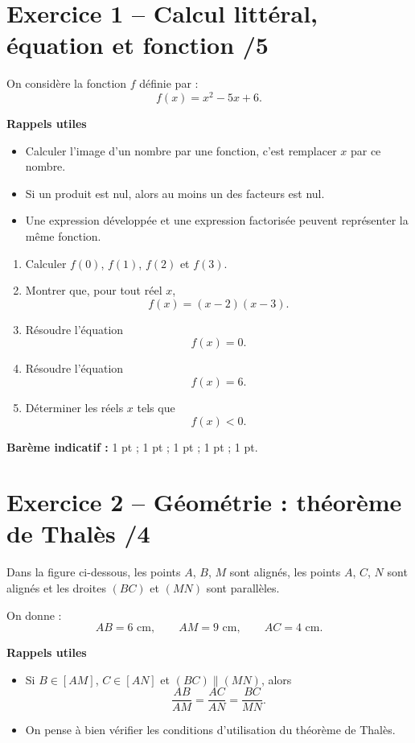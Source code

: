 \documentclass[11pt,a4paper]{article}
\begin{document}
\section*{Exercice 1 -- Calcul littéral, équation et fonction \hfill /5}

On considère la fonction \(f\) définie par :
\[
f(x)=x^2-5x+6.
\]

\textbf{Rappels utiles}
\begin{itemize}[leftmargin=1.2cm]
    \item Calculer l’image d’un nombre par une fonction, c’est remplacer \(x\) par ce nombre.
    \item Si un produit est nul, alors au moins un des facteurs est nul.
    \item Une expression développée et une expression factorisée peuvent représenter la même fonction.
\end{itemize}

\begin{enumerate}
    \item Calculer \(f(0)\), \(f(1)\), \(f(2)\) et \(f(3)\).
    \item Montrer que, pour tout réel \(x\),
    \[
    f(x)=(x-2)(x-3).
    \]
    \item Résoudre l’équation
    \[
    f(x)=0.
    \]
    \item Résoudre l’équation
    \[
    f(x)=6.
    \]
    \item Déterminer les réels \(x\) tels que
    \[
    f(x)<0.
    \]
\end{enumerate}

\textbf{Barème indicatif :} 1 pt ; 1 pt ; 1 pt ; 1 pt ; 1 pt.

\section*{Exercice 2 -- Géométrie : théorème de Thalès \hfill /4}

Dans la figure ci-dessous, les points \(A\), \(B\), \(M\) sont alignés, les points \(A\), \(C\), \(N\) sont alignés et les droites \((BC)\) et \((MN)\) sont parallèles.

On donne :
\[
AB=6 \text{ cm}, \qquad AM=9 \text{ cm}, \qquad AC=4 \text{ cm}.
\]

\textbf{Rappels utiles}
\begin{itemize}[leftmargin=1.2cm]
    \item Si \(B\in[AM]\), \(C\in[AN]\) et \((BC)\parallel(MN)\), alors
    \[
    \frac{AB}{AM}=\frac{AC}{AN}=\frac{BC}{MN}.
    \]
    \item On pense à bien vérifier les conditions d’utilisation du théorème de Thalès.
\end{itemize}
\end{document}
